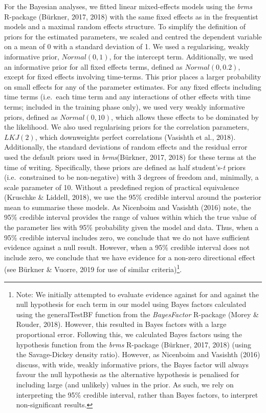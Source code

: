 \documentclass[doc,floatsintext]{apa6}
\let\rmarkdownfootnote\footnote%
\def\footnote{\protect\rmarkdownfootnote}
\begin{document}
For the Bayesian analyses, we fitted linear mixed-effects models using
the \emph{brms} R-package (Bürkner, 2017, 2018) with the same fixed
effects as in the frequentist models and a maximal random effects
structure. To simplify the definition of priors for the estimated
parameters, we scaled and centred the dependent variable on a mean of 0
with a standard deviation of 1. We used a regularising, weakly
informative prior, \(Normal(0, 1)\), for the intercept term.
Additionally, we used an informative prior for all fixed effects terms,
defined as \(Normal(0, 0.2)\), except for fixed effects involving
time-terms. This prior places a larger probability on small effects for
any of the parameter estimates. For any fixed effects including time
terms (i.e.~each time term and any interactions of other effects with
time terms; included in the training phase only), we used very weakly
informative priors, defined as \(Normal(0, 10)\), which allows these
effects to be dominated by the likelihood. We also used regularising
priors for the correlation parameters, \(LKJ(2)\), which downweights
perfect correlations (Vasishth et al., 2018). Additionally, the standard
deviations of random effects and the residual error used the default
priors used in \emph{brms}(Bürkner, 2017, 2018) for these terms at the
time of writing. Specifically, these priors are defined as half
student's-\emph{t} priors (i.e.~constrained to be non-negative) with 3
degrees of freedom and, minimally, a scale parameter of 10. Without a
predefined region of practical equivalence (Kruschke \& Liddell, 2018),
we use the 95\% credible interval around the posterior mean to summarise
these models. As Nicenboim and Vasishth (2016) note, the 95\% credible
interval provides the range of values within which the true value of the
parameter lies with 95\% probability given the model and data. Thus,
when a 95\% credible interval includes zero, we conclude that we do not
have sufficient evidence against a null result. However, when a 95\%
credible interval does not include zero, we conclude that we have
evidence for a non-zero directional effect (see Bürkner \& Vuorre, 2019
for use of similar criteria)\footnote{Note: We initially attempted to
  evaluate evidence against for and against the null hypothesis for each
  term in our model using Bayes factors calculated using the
  generalTestBF function from the \emph{BayesFactor} R-package (Morey \&
  Rouder, 2018). However, this resulted in Bayes factors with a large
  proportional error. Following this, we calculated Bayes factors using
  the hypothesis function from the \emph{brms} R-package (Bürkner, 2017,
  2018) (using the Savage-Dickey density ratio). However, as Nicenboim
  and Vasishth (2016) discuss, with wide, weakly informative priors, the
  Bayes factor will always favour the null hypothesis as the alternative
  hypothesis is penalised for including large (and unlikely) values in
  the prior. As such, we rely on interpreting the 95\% credible
  interval, rather than Bayes factors, to interpret non-significant
  results.}.
\end{document}
